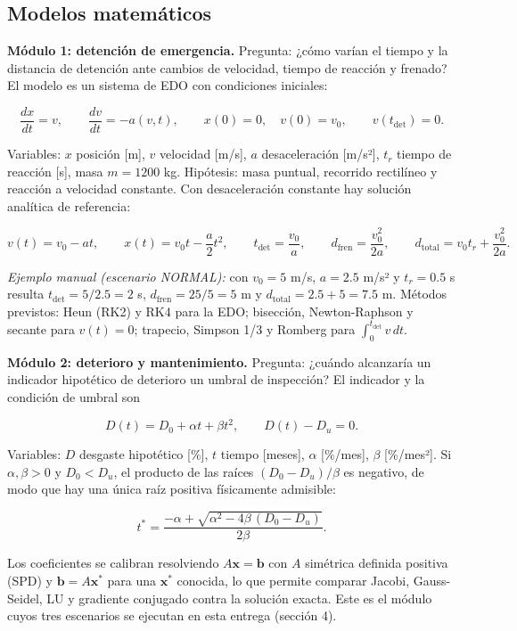 \documentclass[
  11pt,
  letterpaper,
]{article}
\begin{document}
\hypertarget{modelos}{%
\subsection{Modelos matemáticos}\label{modelos}}

\textbf{Módulo 1: detención de emergencia.} Pregunta: ¿cómo varían el
tiempo y la distancia de detención ante cambios de velocidad, tiempo de
reacción y frenado? El modelo es un sistema de EDO con condiciones
iniciales:

\[\frac{dx}{dt}=v,\qquad \frac{dv}{dt}=-a(v,t),\qquad x(0)=0,\quad v(0)=v_0,\qquad v(t_{\mathrm{det}})=0 .\]

Variables: \(x\) posición {[}m{]}, \(v\) velocidad {[}m/s{]}, \(a\)
desaceleración {[}m/s²{]}, \(t_r\) tiempo de reacción {[}s{]}, masa
\(m=1200\) kg. Hipótesis: masa puntual, recorrido rectilíneo y reacción
a velocidad constante. Con desaceleración constante hay solución
analítica de referencia:

\[v(t)=v_0-at,\qquad x(t)=v_0t-\frac{a}{2}t^2,\qquad t_{\mathrm{det}}=\frac{v_0}{a},\qquad d_{\mathrm{fren}}=\frac{v_0^{2}}{2a},\qquad d_{\mathrm{total}}=v_0t_r+\frac{v_0^{2}}{2a}.\]

\emph{Ejemplo manual (escenario NORMAL):} con \(v_0=5\) m/s, \(a=2.5\)
m/s² y \(t_r=0.5\) s resulta \(t_{\mathrm{det}}=5/2.5=2\) s,
\(d_{\mathrm{fren}}=25/5=5\) m y \(d_{\mathrm{total}}=2.5+5=7.5\) m.
Métodos previstos: Heun (RK2) y RK4 para la EDO; bisección,
Newton-Raphson y secante para \(v(t)=0\); trapecio, Simpson 1/3 y
Romberg para \(\int_0^{t_{\mathrm{det}}}v\,dt\).

\textbf{Módulo 2: deterioro y mantenimiento.} Pregunta: ¿cuándo
alcanzaría un indicador hipotético de deterioro un umbral de inspección?
El indicador y la condición de umbral son

\[D(t)=D_0+\alpha t+\beta t^{2},\qquad D(t)-D_u=0 .\]

Variables: \(D\) desgaste hipotético {[}\%{]}, \(t\) tiempo {[}meses{]},
\(\alpha\) {[}\%/mes{]}, \(\beta\) {[}\%/mes²{]}. Si \(\alpha,\beta>0\)
y \(D_0<D_u\), el producto de las raíces \((D_0-D_u)/\beta\) es
negativo, de modo que hay una única raíz positiva físicamente admisible:

\[t^{*}=\frac{-\alpha+\sqrt{\alpha^{2}-4\beta\,(D_0-D_u)}}{2\beta}.\]

Los coeficientes se calibran resolviendo \(A\mathbf{x}=\mathbf{b}\) con
\(A\) simétrica definida positiva (SPD) y \(\mathbf{b}=A\mathbf{x}^{*}\)
para una \(\mathbf{x}^{*}\) conocida, lo que permite comparar Jacobi,
Gauss-Seidel, LU y gradiente conjugado contra la solución exacta. Este
es el módulo cuyos tres escenarios se ejecutan en esta entrega (sección
4).
\end{document}
